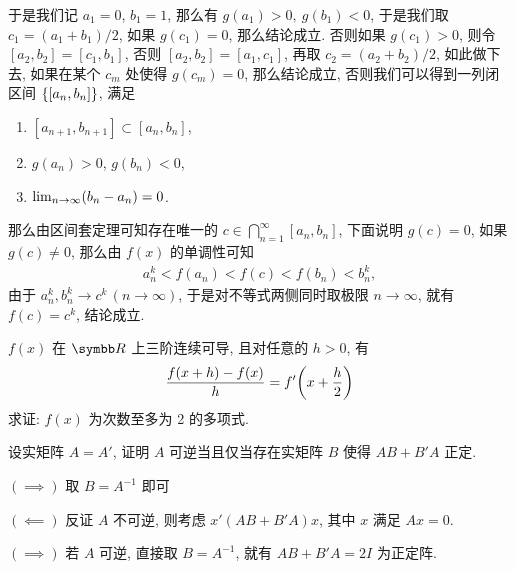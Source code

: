 \begin{exercise}[series=exer]
\begin{answer}
        于是我们记 $ a_{1} = 0 $, $ b_{1} = 1 $, 那么有 $ g(a_{1}) > 0,\ g(b_{1}) < 0 $, 于是我们取 $ c_{1} = (a_{1} + b_{1})/2 $, 如果 $ g(c_{1}) = 0 $, 那么结论成立. 否则如果 $ g(c_{1}) > 0 $, 则令 $ [a_{2}, b_{2}] = [c_{1}, b_{1}] $, 否则 $ [a_{2}, b_{2}] = [a_{1}, c_{1}] $, 再取 $ c_{2} = (a_{2} + b_{2})/2 $, 如此做下去, 如果在某个 $ c_{m} $ 处使得 $ g(c_{m}) = 0 $, 那么结论成立, 否则我们可以得到一列闭区间 $ \qty{[a_{n}, b_{n}]} $, 满足
        \begin{enumerate}
            \item $ [a_{n + 1}, b_{n + 1}] \subset [a_{n}, b_{n}] $,
            \item $ g(a_{n}) > 0 $, $ g(b_{n}) < 0 $,
            \item $ \lim_{n \to \infty}(b_{n} - a_{n}) = 0 $. 
        \end{enumerate}
        那么由区间套定理可知存在唯一的 $ c \in \bigcap_{n = 1}^{\infty} [a_{n}, b_{n}] $, 下面说明 $ g(c) = 0 $, 如果 $ g(c) \ne 0 $, 那么由 $ f(x) $ 的单调性可知
        \begin{align*}
            a_{n}^{k} < f(a_{n}) < f(c) < f(b_{n}) < b_{n}^{k},
        \end{align*}
        由于 $ a_{n}^{k}, b_{n}^{k} \to c^{k}\,(n \to \infty) $, 于是对不等式两侧同时取极限 $ n \to \infty $, 就有 $ f(c) = c^{k} $, 结论成立. 
    \end{answer}
    \item $ f(x) $ 在 $ \R $ 上三阶连续可导, 且对任意的 $ h > 0 $, 有
    \begin{align*}
        \frac{f(x + h) - f(x)}{h} = f'\qty(x + \frac{h}{2})
    \end{align*}
    求证: $ f(x) $ 为次数至多为 2 的多项式.
    \item 设实矩阵 $ A = A' $, 证明 $ A $ 可逆当且仅当存在实矩阵 $ B $ 使得 $ AB + B'A $ 正定.
    \begin{hint}
        $ (\implies) $ 取 $ B = A^{-1} $ 即可

        $ (\impliedby) $ 反证 $ A $ 不可逆, 则考虑 $ x'(AB + B'A)x $, 其中 $ x $ 满足 $ Ax = 0 $. 
    \end{hint}
    \begin{answer}
        $ (\implies) $ 若 $ A $ 可逆, 直接取 $ B = A^{-1} $, 就有 $ AB + B'A = 2I $ 为正定阵. 


\end{answer}
\end{exercise}
